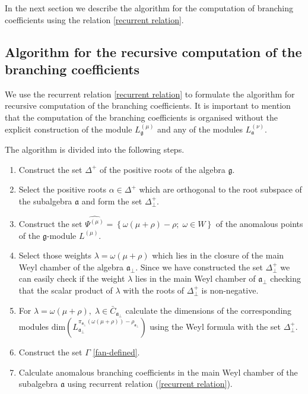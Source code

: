 \documentclass[a4paper,12pt]{article}
\theoremstyle{definition} \newtheorem{Def}{Definition}
\begin{document}
  In the next section we describe the algorithm for the computation of branching coefficients using the relation \eqref{recurrent relation}.

\subsection{Algorithm for the recursive computation of the branching coefficients}
\label{sec:algorithm}

We use the recurrent relation \eqref{recurrent relation} to formulate the algorithm for recursive computation of the branching coefficients. It is important to mention that the computation of the branching coefficients is organised without the  explicit construction of the module $L^{(\mu)}_{\mathfrak{g}}$ and any of the modules $L^{(\nu)}_{\mathfrak{a}}$.

The algorithm is divided into the following steps.
\begin{enumerate}
\item Construct the set $\Delta^{+}$ of the positive roots of the algebra $\mathfrak{g}$.
\item Select the positive roots $\alpha\in \Delta^{+}$ which are orthogonal to the root subspace of the subalgebra $\mathfrak{a}$ and form the set $\Delta^{+}_{\bot}$.
\item Construct the set $\widehat{\Psi^{(\mu)}}=\left\{\omega(\mu+\rho)-\rho;\; \omega\in W\right\}$ of the anomalous points of the $\mathfrak{g}$-module $L^{(\mu)}$.
\item Select those weights $\lambda=\omega(\mu+\rho)$ which lies in the closure of the main Weyl chamber of the algebra $\mathfrak{a}_{\bot}$. Since we have constructed the set $\Delta^{+}_{\bot}$ we can easily check if the weight $\lambda$ lies in the main Weyl chamber of $\mathfrak{a}_{\bot}$ checking that the scalar product of $\lambda$ with the roots of $\Delta^{+}_{\bot}$ is non-negative.
\item For $\lambda=\omega(\mu+\rho),\; \lambda\in \bar{C}_{\mathfrak{a}_{\bot}}$ calculate the dimensions of the corresponding modules $\mathrm{dim}\left(L^{\pi_{\mathfrak{a}_{\bot}}(\omega(\mu+\rho))-\rho_{\mathfrak{a}_{\bot}}}_{\mathfrak{a}_{\bot}}\right)$ using the Weyl formula with the set $\Delta^{+}_{\bot}$.
\item Construct the set $\Gamma$ \eqref{fan-defined}.
\item Calculate anomalous branching coefficients in the main Weyl
  chamber of the subalgebra $\mathfrak{a}$ using recurrent relation (\ref{recurrent relation}).
\end{enumerate}
\end{document}
